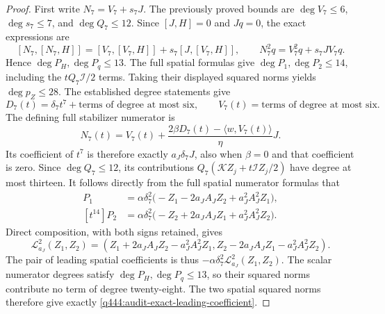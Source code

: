 \begin{proof}

First write $N_7=V_7+s_7J$. The previously proved bounds are
$\deg V_7\le6$, $\deg s_7\le7$, and $\deg Q_7\le12$.
Since $[J,H]=0$ and $Jq=0$, the exact expressions are
\[
 [N_7,[N_7,H]]=[V_7,[V_7,H]]+s_7[J,[V_7,H]],\qquad
 N_7^2q=V_7^2q+s_7JV_7q.
\]
Hence $\deg P_H,\deg P_q\le13$. The full spatial formulas give
$\deg P_1,\deg P_2\le14$, including the $tQ_7\mathcal I/2$ terms.
Taking their displayed squared norms yields $\deg p_Z\le28$.
The established degree statements give
\[
 D_7(t)=\delta_7t^7+\text{terms of degree at most six},\qquad
 V_7(t)=\text{terms of degree at most six}.
\]
The defining full stabilizer numerator is
\[
 N_7(t)=V_7(t)+
    \frac{2\beta D_7(t)-\langle w,V_7(t)\rangle}{\eta}J.
\]
Its coefficient of $t^7$ is therefore exactly $a_J\delta_7J$,
also when $\beta=0$ and that coefficient is zero. Since
$\deg Q_7\le12$, its contributions
$Q_7(\mathcal KZ_j+t\mathcal IZ_j/2)$ have degree at most thirteen.
It follows directly from the full spatial numerator formulas that
\begin{align*}
 [t^{14}]P_1
 &=\alpha\delta_7^2
       \bigl(-Z_1-2a_J A_JZ_2+a_J^2A_J^2Z_1\bigr),\\
 [t^{14}]P_2
 &=\alpha\delta_7^2
       \bigl(-Z_2+2a_J A_JZ_1+a_J^2A_J^2Z_2\bigr).
\end{align*}
Direct composition, with both signs retained, gives
\[
 \mathcal L_{a_J}^2(Z_1,Z_2)
 =(Z_1+2a_J A_JZ_2-a_J^2A_J^2Z_1,
   Z_2-2a_J A_JZ_1-a_J^2A_J^2Z_2).
\]
The pair of leading spatial coefficients is thus
$-\alpha\delta_7^2\mathcal L_{a_J}^2(Z_1,Z_2)$.
The scalar numerator degrees satisfy $\deg P_H,\deg P_q\le13$,
so their squared norms contribute no term of degree twenty-eight.
The two spatial squared norms therefore give exactly
\eqref{q444:audit-exact-leading-coefficient}.


\end{proof}

